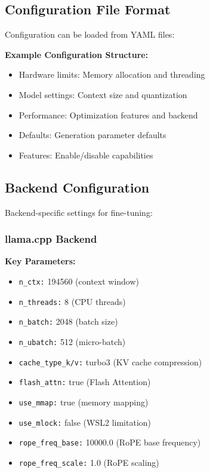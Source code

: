\subsection{Configuration File Format}

Configuration can be loaded from YAML files:

\textbf{Example Configuration Structure:}
\begin{itemize}
    \item Hardware limits: Memory allocation and threading
    \item Model settings: Context size and quantization
    \item Performance: Optimization features and backend
    \item Defaults: Generation parameter defaults
    \item Features: Enable/disable capabilities
\end{itemize}

\subsection{Backend Configuration}

Backend-specific settings for fine-tuning:

\subsubsection{llama.cpp Backend}

\textbf{Key Parameters:}
\begin{itemize}
    \item \texttt{n\_ctx:} 194560 (context window)
    \item \texttt{n\_threads:} 8 (CPU threads)
    \item \texttt{n\_batch:} 2048 (batch size)
    \item \texttt{n\_ubatch:} 512 (micro-batch)
    \item \texttt{cache\_type\_k/v:} turbo3 (KV cache compression)
    \item \texttt{flash\_attn:} true (Flash Attention)
    \item \texttt{use\_mmap:} true (memory mapping)
    \item \texttt{use\_mlock:} false (WSL2 limitation)
    \item \texttt{rope\_freq\_base:} 10000.0 (RoPE base frequency)
    \item \texttt{rope\_freq\_scale:} 1.0 (RoPE scaling)
\end{itemize}

